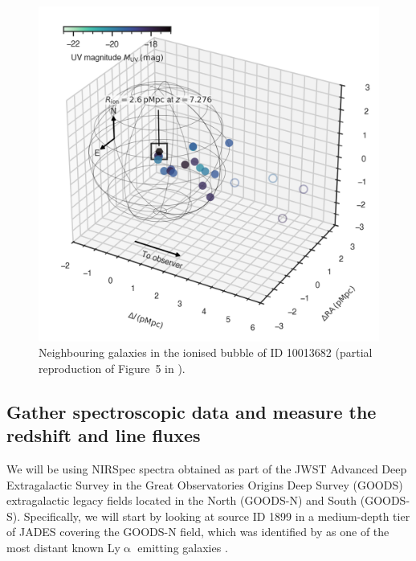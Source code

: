 \documentclass{article}
\newcommand{\Lya}{{Ly\ensuremath{\upalpha}}\xspace}
\theoremstyle{definition}
\begin{document}
\begin{figure}
	\centering
	\includegraphics[width=\linewidth]{"10013682_3D_mapping"}
	\caption{Neighbouring galaxies in the ionised bubble of ID 10013682 (partial reproduction of Figure~5 in \citealt{2024A&A...682A..40W}).
	}
	\label{fig:IGM_transmission}
\end{figure}

\subsection{Gather spectroscopic data and measure the redshift and line fluxes}
\label{ssec:Measure_redshift_and_line_fluxes}

We will be using NIRSpec spectra obtained as part of the JWST Advanced Deep Extragalactic Survey \citep[JADES;][]{2023arXiv230602465E} in the Great Observatories Origins Deep Survey (GOODS) extragalactic legacy fields located in the North (GOODS-N) and South (GOODS-S). Specifically, we will start by looking at source ID 1899 in a medium-depth tier of JADES covering the GOODS-N field, which was identified by \citet{2025MNRAS.536...27W} as one of the most distant known \Lya emitting galaxies \citep[LAEs; see also][]{2024ApJ...975..208T, 2024arXiv240714201N}.
\end{document}
